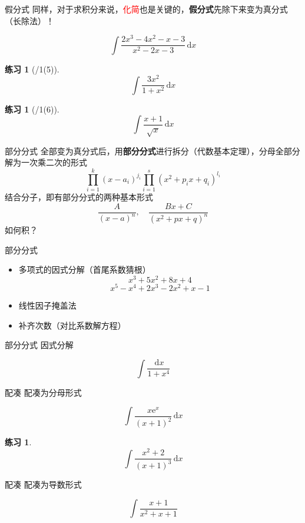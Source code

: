 \documentclass[UTF8]{ctexbeamer}
\def\diff{\,\mathrm{d}}
\newtheorem{exercise}[theorem]{练习} %
\begin{document}
\begin{frame}{假分式}
同样，对于求积分来说，{\large\textcolor{red}{化简}}也是关键的，\textbf{假分式}先除下来变为真分式（长除法）！
\begin{example}
\[\int\frac{2x^3-4x^2-x-3}{x^2-2x-3}\diff x\]
\end{example}
\begin{exercise}[/1(5)]
\[\int\frac{3x^2}{1+x^2}\diff x\]
\end{exercise}
\begin{exercise}[/1(6)]
\[\int\frac{x+1}{\sqrt{x}}\diff x\]
\end{exercise}
\end{frame}

\begin{frame}{部分分式}
全部变为真分式后，用\textbf{部分分式}进行拆分（代数基本定理），分母全部分解为一次乘二次的形式
\[\prod_{i=1}^k(x-a_i)^{j_i}\prod_{i=1}^s(x^2+p_ix+q_i)^{l_i}\]
结合分子，即有部分分式的两种基本形式
\[\frac{A}{(x-a)^n},\quad\frac{Bx+C}{(x^2+px+q)^n}\]
如何积？
\end{frame}

\begin{frame}{部分分式}
\begin{itemize}
	\item 多项式的因式分解（首尾系数猜根）
	\[x^3+5x^2+8x+4\]
	\[x^5-x^4+2x^3-2x^2+x-1\]
	\item 线性因子掩盖法
	\item 补齐次数（对比系数解方程）
\end{itemize}
\end{frame}

\begin{frame}{部分分式}
因式分解
\begin{example}
\[\int\frac{\diff x}{1+x^4}\]
\end{example}
\end{frame}

\begin{frame}{配凑}
配凑为分母形式
\begin{example}
\[\int\frac{x\mathrm{e}^x}{(x+1)^2}\diff x\]
\end{example}
\begin{exercise}
\[\int\frac{x^2+2}{(x+1)^3}\diff x\]
\end{exercise}
\end{frame}

\begin{frame}{配凑}
配凑为导数形式
\begin{example}
\[\int\frac{x+1}{x^2+x+1}\]
\end{example}
\end{frame}
\end{document}
